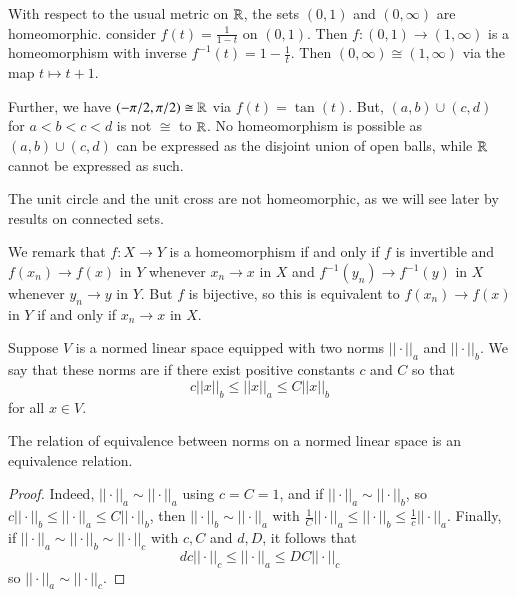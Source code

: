 \begin{example}
    With respect to the usual metric on $\mathbb R$, the sets $(0,1)$ and $(0,\infty)$ are homeomorphic. consider $f(t) = \frac{1}{1-t}$ on $(0,1)$. Then $f:(0,1)\rightarrow (1,\infty)$ is a homeomorphism with inverse $f^{-1}(t) = 1 - \frac{1}{t}$. Then $(0,\infty)\cong (1,\infty)$ via the map $t\mapsto t+1$. 

    Further, we have $(-\pi/2,\pi/2)\cong \mathbb R$ via $f(t) = \tan(t)$. But, $(a,b)\cup(c,d)$ for $a < b < c < d$ is not $\cong$ to $\mathbb R$. No homeomorphism is possible as $(a,b) \cup (c,d)$ can be expressed as the disjoint union of open balls, while $\mathbb R$ cannot be expressed as such.
\end{example}


\begin{example}
    The unit circle and the unit cross are not homeomorphic, as we will see later by results on connected sets.
\end{example}

We remark that $f:X\rightarrow Y$ is a homeomorphism if and only if $f$ is invertible and $f(x_n)\rightarrow f(x)$ in $Y$ whenever $x_n\rightarrow x$ in $X$ and $f^{-1}(y_n)\rightarrow f^{-1}(y)$ in $X$ whenever $y_n\rightarrow y$ in $Y$. But $f$ is bijective, so this is equivalent to $f(x_n)\rightarrow f(x)$ in $Y$ if and only if $x_n\rightarrow x$ in $X$.

\begin{definition}
    Suppose $V$ is a normed linear space equipped with two norms $||\cdot ||_a$ and $||\cdot||_b$. We say that these norms are  if there exist positive constants $c$ and $C$ so that $$c||x||_b \leq ||x||_a\leq C||x||_b$$ for all $x \in V$.
\end{definition}

\begin{proposition}
    The relation of equivalence between norms on a normed linear space is an equivalence relation.
\end{proposition}
\begin{proof}
    Indeed, $||\cdot||_a \sim ||\cdot||_a$ using $c = C = 1$, and if $||\cdot||_a\sim||\cdot ||_b$, so $c||\cdot||_b \leq ||\cdot||_a \leq C||\cdot||_b$, then $||\cdot||_b\sim||\cdot||_a$ with $\frac{1}{C}||\cdot||_a \leq ||\cdot||_b\leq \frac{1}{c}||\cdot ||_a$. Finally, if $||\cdot||_a\sim||\cdot||_b\sim||\cdot||_c$ with $c,C$ and $d,D$, it follows that $$dc||\cdot||_c \leq ||\cdot||_a\leq DC||\cdot||_c$$ so $||\cdot||_a\sim||\cdot||_c$.
\end{proof}

